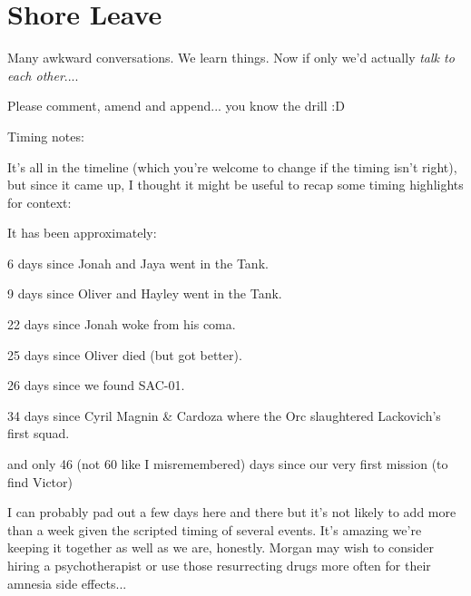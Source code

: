 \setcounter{chapter}{ 13 }
\chapter{\textbf{Shore Leave} }








Many awkward conversations.  We learn things.  Now if only we'd actually \textit{talk to each other}....



Please comment, amend and append... you know the drill :D



\noindent\hrulefill



 {\LARGE Timing notes: } 



It's all in the timeline (which you're welcome to change if the timing isn't right), but since it came up, I thought it might be useful to recap some timing highlights for context:



It has been approximately:

6 days since Jonah and Jaya went in the Tank.  

9 days since Oliver and Hayley went in the Tank.

22 days since Jonah woke from his coma.

25 days since Oliver died (but got better).

26 days since we found SAC-01.  

34 days since Cyril Magnin \& Cardoza where the Orc slaughtered Lackovich's first squad. 

and only 46 (not 60 like I misremembered) days since our very first mission (to find Victor)



I can probably pad out a few days here and there but it's not likely to add more than a week given the scripted timing of several events.  It's amazing we're keeping it together as well as we are, honestly.  Morgan may wish to consider hiring a psychotherapist or use those resurrecting drugs more often for their amnesia side effects...



\noindent\hrulefill





